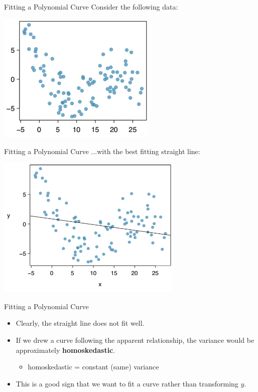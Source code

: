 \begin{frame}{Fitting a Polynomial Curve}
    Consider the following data:
    \begin{center}
        \includegraphics[width=3in]{images/nonlindata2.png}
    \end{center}
\end{frame}

\begin{frame}{Fitting a Polynomial Curve}
    ...with the best fitting straight line:
    \begin{center}
        \includegraphics[width=3.5in]{images/nonlindata3.png}
    \end{center}
\end{frame}

\begin{frame}{Fitting a Polynomial Curve}
    \begin{itemize}
        \item Clearly, the straight line does not fit well.
        \item If we drew a curve following the apparent relationship, the variance would be approximately \textbf{homoskedastic}.
        \begin{itemize}
            \item homoskedastic = constant (same) variance
        \end{itemize}
        \item This is a good sign that we want to fit a curve rather than transforming $y$.
    \end{itemize}
\end{frame}

